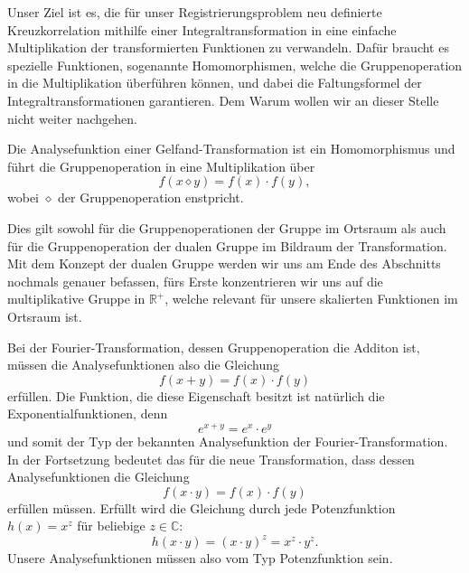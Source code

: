 Unser Ziel ist es, die für unser Registrierungsproblem neu definierte 
Kreuzkorrelation mithilfe einer Integraltransformation in eine 
einfache Multiplikation der transformierten Funktionen zu verwandeln.
Dafür braucht es spezielle Funktionen, sogenannte Homomorphismen, 
welche die Gruppenoperation in die Multiplikation überführen können, 
und dabei die Faltungsformel der Integraltransformationen garantieren.
Dem Warum wollen wir an dieser Stelle nicht weiter nachgehen.
\begin{satz}
    Die Analysefunktion einer Gelfand-Transformation ist ein 
    Homomorphismus und führt die Gruppenoperation in eine 
    Multiplikation über
    \[
        f(x \diamond y) 
        = f(x) \cdot f(y)
        ,
    \]
    wobei $\diamond$ der Gruppenoperation enstpricht.
\end{satz}
Dies gilt sowohl für die Gruppenoperationen der Gruppe im Ortsraum 
als auch für die Gruppenoperation der dualen Gruppe im Bildraum der 
Transformation.
Mit dem Konzept der dualen Gruppe werden wir uns am Ende des 
Abschnitts nochmals genauer befassen, fürs Erste konzentrieren wir 
uns auf die multiplikative Gruppe in $\mathbb{R^+}$, welche relevant 
für unsere skalierten Funktionen im Ortsraum ist.

Bei der Fourier-Transformation, dessen Gruppenoperation die Additon 
ist, müssen die Analysefunktionen also die Gleichung 
\begin{equation}
    f(x + y) 
    = f(x) \cdot f(y)
    \label{mellin:hom1}
\end{equation}
erfüllen. 
Die Funktion, die diese Eigenschaft besitzt ist natürlich die 
Exponentialfunktionen, denn 
\begin{equation}
    e^{x + y} 
    = e^x \cdot e^y
    \label{mellin:exp}
\end{equation}
und somit der Typ der bekannten Analysefunktion der 
Fourier-Transformation.
In der Fortsetzung bedeutet das für die neue Transformation, dass 
dessen Analysefunktionen die Gleichung
\begin{equation}
    f(x \cdot y) 
    = f(x) \cdot f(y)
    \label{mellin:hom2}
\end{equation}
erfüllen müssen.
Erfüllt wird die Gleichung durch jede Potenzfunktion $h(x) = x^{z}$ 
für beliebige $z \in \mathbb{C}$:
\begin{equation}
    h(x \cdot y) 
    = (x \cdot y)^{z} = x^{z} \cdot y^{z}
    .
\end{equation}
Unsere Analysefunktionen müssen also vom Typ Potenzfunktion sein.

